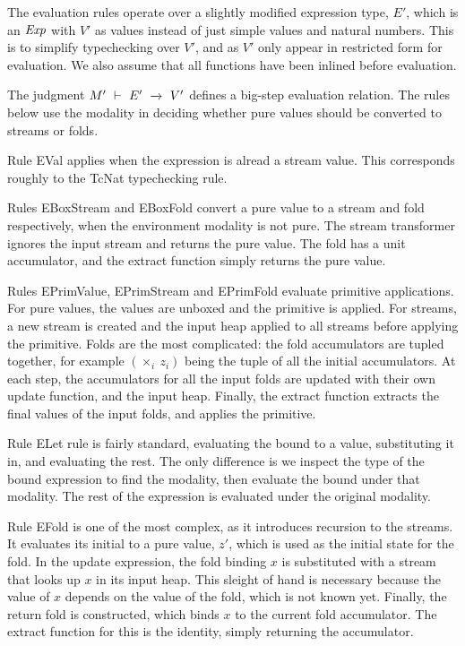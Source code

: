 The evaluation rules operate over a slightly modified expression type, $E'$, which is an $\mathit{Exp}$ with $V'$ as values instead of just simple values and natural numbers.
This is to simplify typechecking over $V'$, and as $V'$ only appear in restricted form for evaluation.
We also assume that all functions have been inlined before evaluation.

The judgment $M'~\vdash~E'~\xrightarrow~~V'$ defines a big-step evaluation relation.
The rules below use the modality in deciding whether pure values should be converted to streams or folds.

Rule EVal applies when the expression is alread a stream value.
This corresponds roughly to the TcNat typechecking rule.

Rules EBoxStream and EBoxFold convert a pure value to a stream and fold respectively, when the environment modality is not pure.
The stream transformer ignores the input stream and returns the pure value.
The fold has a unit accumulator, and the extract function simply returns the pure value.

Rules EPrimValue, EPrimStream and EPrimFold evaluate primitive applications.
For pure values, the values are unboxed and the primitive is applied.
For streams, a new stream is created and the input heap applied to all streams before applying the primitive.
Folds are the most complicated: the fold accumulators are tupled together, for example $(\times_i~z_i)$ being the tuple of all the initial accumulators.
At each step, the accumulators for all the input folds are updated with their own update function, and the input heap.
Finally, the extract function extracts the final values of the input folds, and applies the primitive.

Rule ELet rule is fairly standard, evaluating the bound to a value, substituting it in, and evaluating the rest.
The only difference is we inspect the type of the bound expression to find the modality, then evaluate the bound under that modality.
The rest of the expression is evaluated under the original modality.

Rule EFold is one of the most complex, as it introduces recursion to the streams.
It evaluates its initial to a pure value, $z'$, which is used as the initial state for the fold.
In the update expression, the fold binding $x$ is substituted with a stream that looks up $x$ in its input heap.
This sleight of hand is necessary because the value of $x$ depends on the value of the fold, which is not known yet.
Finally, the return fold is constructed, which binds $x$ to the current fold accumulator.
The extract function for this is the identity, simply returning the accumulator.

